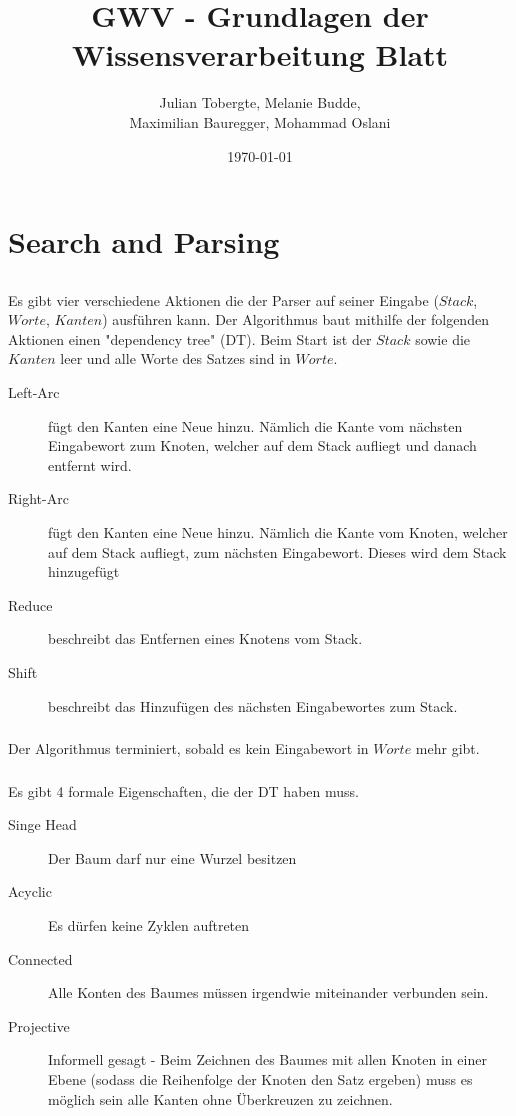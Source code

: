 \documentclass[DIV=calc,numbers=noenddot]{scrartcl}
\title{GWV - Grundlagen der Wissensverarbeitung Blatt \arabic{blatt}}
\author{Julian Tobergte, Melanie Budde,\\Maximilian Bauregger, Mohammad Oslani}
\date{\today}
\begin{document}
	\maketitle
	\section{Search and Parsing}
		\subsection{}
			\subsubsection{}
				Es gibt vier verschiedene Aktionen die der Parser auf seiner Eingabe ($Stack$, $Worte$, $Kanten$) ausführen kann. Der Algorithmus baut mithilfe der folgenden Aktionen einen "dependency tree" (DT). Beim Start ist der $Stack$ sowie die $Kanten$ leer und alle Worte des Satzes sind in $Worte$.
				\begin{description}
					\item[Left-Arc] fügt den Kanten eine Neue hinzu. Nämlich die Kante vom nächsten Eingabewort zum Knoten, welcher auf dem Stack aufliegt und danach entfernt wird.
					\item[Right-Arc] fügt den Kanten eine Neue hinzu. Nämlich die Kante vom Knoten, welcher auf dem Stack aufliegt, zum nächsten Eingabewort. Dieses wird dem Stack hinzugefügt
					\item[Reduce] beschreibt das Entfernen eines Knotens vom Stack.
					\item[Shift] beschreibt das Hinzufügen des nächsten Eingabewortes zum Stack.
				\end{description}
			\subsubsection{}
				Der Algorithmus terminiert, sobald es kein Eingabewort in $Worte$ mehr gibt.
			\subsubsection{}
				Es gibt 4 formale Eigenschaften, die der DT haben muss.
				\begin{description}
					\item[Singe Head] Der Baum darf nur eine Wurzel besitzen
					\item[Acyclic] Es dürfen keine Zyklen auftreten
					\item[Connected] Alle Konten des Baumes müssen irgendwie miteinander verbunden sein.
					\item[Projective] Informell gesagt - Beim Zeichnen des Baumes mit allen Knoten in einer Ebene (sodass die Reihenfolge der Knoten den Satz ergeben) muss es möglich sein alle Kanten ohne Überkreuzen zu zeichnen.
				\end{description}
\end{document}

